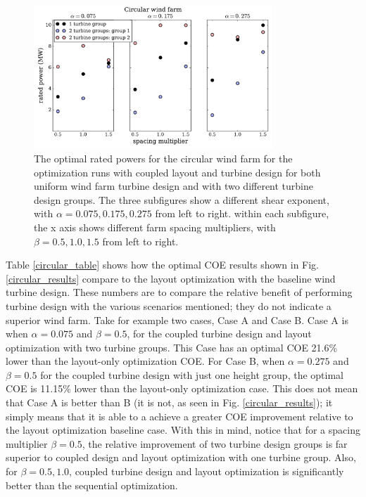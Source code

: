 \begin{figure}[htbp]
  \centering
  \includegraphics[width=0.8\textwidth]{Figures/circlePowers.pdf}
  \caption{\label{circular_power} The optimal rated powers for the circular wind farm for the optimization runs with coupled layout and turbine design for both uniform wind farm turbine design and with two different turbine design groups. The three subfigures show a different shear exponent, with $\alpha=0.075,0.175,0.275$ from left to right. within each subfigure, the x axis shows different farm spacing multipliers, with $\beta=0.5,1.0,1.5$ from left to right.}
\end{figure}

Table \ref{circular_table} shows how the optimal COE results shown in Fig. \ref{circular_results} compare to the layout optimization with the baseline wind turbine design. These numbers are to compare the relative benefit of performing turbine design with the various scenarios mentioned; they do not indicate a superior wind farm. Take for example two cases, Case A and Case B. Case A is when $\alpha=0.075$ and $\beta=0.5$, for the coupled turbine design and layout optimization with two turbine groups. This Case has an optimal COE 21.6\% lower than the layout-only optimization COE. For Case B, when $\alpha=0.275$ and $\beta=0.5$ for the coupled turbine design with just one height group, the optimal COE is 11.15\% lower than the layout-only optimization case. This does not mean that Case A is better than B (it is not, as seen in Fig. \ref{circular_results}); it simply means that it is able to a achieve a greater COE improvement relative to the layout optimization baseline case. With this in mind, notice that for a spacing multiplier $\beta=0.5$, the relative improvement of two turbine design groups is far superior to coupled design and layout optimization with one turbine group. Also, for $\beta=0.5,1.0$, coupled turbine design and layout optimization is significantly better than the sequential optimization.

